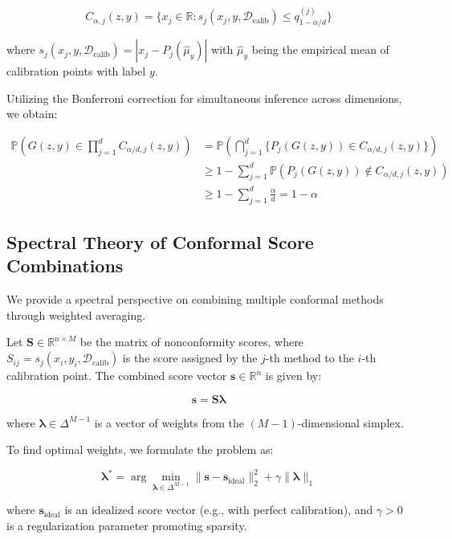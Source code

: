 \documentclass{article}
\theoremstyle{plain}
\theoremstyle{definition}
\theoremstyle{remark}
\begin{document}
\begin{equation}
C_{\alpha,j}(z, y) = \{x_j \in \mathbb{R}: s_j(x_j, y, \mathcal{D}_{\text{calib}}) \leq q_{1-\alpha/d}^{(j)}\}
\end{equation}

where $s_j(x_j, y, \mathcal{D}_{\text{calib}}) = |x_j - P_j(\hat{\mu}_y)|$ with $\hat{\mu}_y$ being the empirical mean of calibration points with label $y$.

Utilizing the Bonferroni correction for simultaneous inference across dimensions, we obtain:

\begin{align}
\mathbb{P}(G(z, y) \in \prod_{j=1}^d C_{\alpha/d,j}(z, y)) &= \mathbb{P}\left(\bigcap_{j=1}^d \{P_j(G(z, y)) \in C_{\alpha/d,j}(z, y)\}\right) \\
&\geq 1 - \sum_{j=1}^d \mathbb{P}(P_j(G(z, y)) \not\in C_{\alpha/d,j}(z, y)) \\
&\geq 1 - \sum_{j=1}^d \frac{\alpha}{d} = 1 - \alpha
\end{align}

\subsection{Spectral Theory of Conformal Score Combinations}

We provide a spectral perspective on combining multiple conformal methods through weighted averaging.

Let $\mathbf{S} \in \mathbb{R}^{n \times M}$ be the matrix of nonconformity scores, where $S_{ij} = s_j(x_i, y_i, \mathcal{D}_{\text{calib}})$ is the score assigned by the $j$-th method to the $i$-th calibration point. The combined score vector $\mathbf{s} \in \mathbb{R}^n$ is given by:

\begin{equation}
\mathbf{s} = \mathbf{S} \boldsymbol{\lambda}
\end{equation}

where $\boldsymbol{\lambda} \in \Delta^{M-1}$ is a vector of weights from the $(M-1)$-dimensional simplex.

To find optimal weights, we formulate the problem as:

\begin{equation}
\boldsymbol{\lambda}^* = \arg\min_{\boldsymbol{\lambda} \in \Delta^{M-1}} \|\mathbf{s} - \mathbf{s}_{\text{ideal}}\|_2^2 + \gamma \|\boldsymbol{\lambda}\|_1
\end{equation}

where $\mathbf{s}_{\text{ideal}}$ is an idealized score vector (e.g., with perfect calibration), and $\gamma > 0$ is a regularization parameter promoting sparsity.
\end{document}
